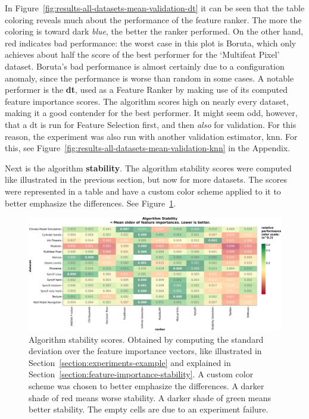 \documentclass[../main.tex]{subfiles}
\begin{document}
In Figure~\ref{fig:results-all-datasets-mean-validation-dt} it can be seen that the table coloring reveals much about the performance of the feature ranker. The more the coloring is toward dark \textit{blue}, the better the ranker performed. On the other hand, red indicates bad performance: the worst case in this plot is Boruta, which only achieves about half the score of the best performer for the `Multifeat Pixel' dataset. Boruta's bad performance is almost certainly due to a configuration anomaly, since the performance is worse than random in some cases. A notable performer is the \textbf{\gls{dt}}, used as a Feature Ranker by making use of its computed feature importance scores. The algorithm scores high on nearly every dataset, making it a good contender for the best performer. It might seem odd, however, that a \gls{dt} is run for Feature Selection first, and then \textit{also} for validation. For this reason, the experiment was also run with another validation estimator, \gls{knn}. For this, see Figure~\ref{fig:results-all-datasets-mean-validation-knn} in the Appendix.

Next is the algorithm \textbf{stability}. The algorithm stability scores were computed like illustrated in the previous section, but now for more datasets. The scores were represented in a table and have a custom color scheme applied to it to better emphasize the differences. See Figure~\ref{fig:results-all-datasets-stability-scores}.

\begin{figure}[ht]
    \centering
    \includegraphics[width=\linewidth]{report/images/results-all-datasets-stability-scores.pdf}
    \caption{Algorithm stability scores. Obtained by computing the standard deviation over the feature importance vectors, like illustrated in Section~\ref{section:experiments-example} and explained in Section~\ref{section:feature-importance-stability}. A custom color scheme was chosen to better emphasize the differences. A darker shade of red means worse stability. A darker shade of green means better stability. The empty cells are due to an experiment failure.}
    \label{fig:results-all-datasets-stability-scores}
\end{figure}
\end{document}
